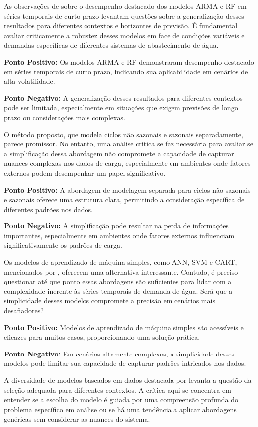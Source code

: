 As observações de  sobre o desempenho destacado dos modelos ARMA e RF em séries temporais de curto prazo levantam questões sobre a generalização desses resultados para diferentes contextos e horizontes de previsão. É fundamental avaliar criticamente a robustez desses modelos em face de condições variáveis e demandas específicas de diferentes sistemas de abastecimento de água.

\textbf{Ponto Positivo:} Os modelos ARMA e RF demonstraram desempenho destacado em séries temporais de curto prazo, indicando sua aplicabilidade em cenários de alta volatilidade.

\textbf{Ponto Negativo:} A generalização desses resultados para diferentes contextos pode ser limitada, especialmente em situações que exigem previsões de longo prazo ou considerações mais complexas.

O método proposto, que modela ciclos não sazonais e sazonais separadamente, parece promissor. No entanto, uma análise crítica se faz necessária para avaliar se a simplificação dessa abordagem não compromete a capacidade de capturar nuances complexas nos dados de carga, especialmente em ambientes onde fatores externos podem desempenhar um papel significativo.

\textbf{Ponto Positivo:} A abordagem de modelagem separada para ciclos não sazonais e sazonais oferece uma estrutura clara, permitindo a consideração específica de diferentes padrões nos dados.

\textbf{Ponto Negativo:} A simplificação pode resultar na perda de informações importantes, especialmente em ambientes onde fatores externos influenciam significativamente os padrões de carga.

Os modelos de aprendizado de máquina simples, como ANN, SVM e CART, mencionados por , oferecem uma alternativa interessante. Contudo, é preciso questionar até que ponto essas abordagens são suficientes para lidar com a complexidade inerente às séries temporais de demanda de água. Será que a simplicidade desses modelos compromete a precisão em cenários mais desafiadores?

\textbf{Ponto Positivo:} Modelos de aprendizado de máquina simples são acessíveis e eficazes para muitos casos, proporcionando uma solução prática.

\textbf{Ponto Negativo:} Em cenários altamente complexos, a simplicidade desses modelos pode limitar sua capacidade de capturar padrões intricados nos dados.

A diversidade de modelos baseados em dados destacada por  levanta a questão da seleção adequada para diferentes contextos. A crítica aqui se concentra em entender se a escolha do modelo é guiada por uma compreensão profunda do problema específico em análise ou se há uma tendência a aplicar abordagens genéricas sem considerar as nuances do sistema.

